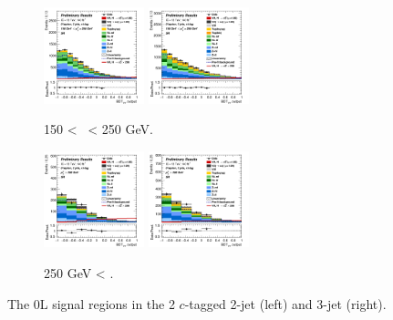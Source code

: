 \vspace*{\fill}

\begin{figure}[h!]
    \centering
    \begin{subfigure}[b]{\textwidth}
        \centering
        \includegraphics[width=0.32\textwidth]{Images/VH/Own_fit/postfit_VHcc/Region_distmva_BMax250_BMin150_DSR_J2_TTypext_T2_L0_Y6051_GlobalFit_conditionnal_mu1.png}
        \includegraphics[width=0.32\textwidth]{Images/VH/Own_fit/postfit_VHcc/Region_distmva_BMax250_BMin150_DSR_J3_TTypext_T2_L0_Y6051_GlobalFit_conditionnal_mu1.png}
        \caption{150 < \ptv\ < 250 GeV.}
        \label{fig:plots_VHcc_OL_150_SR_2c}
    \end{subfigure}
    \begin{subfigure}[b]{\textwidth}
        \centering
        \includegraphics[width=0.32\textwidth]{Images/VH/Own_fit/postfit_VHcc/Region_distmva_BMin250_DSR_J2_TTypext_T2_L0_Y6051_GlobalFit_conditionnal_mu1.png}
        \includegraphics[width=0.32\textwidth]{Images/VH/Own_fit/postfit_VHcc/Region_distmva_BMin250_DSR_J3_TTypext_T2_L0_Y6051_GlobalFit_conditionnal_mu1.png}
        \caption{250 GeV < \ptv.}
        \label{fig:plots_VHcc_OL_250_SR_2c}
    \end{subfigure}
    \caption{The 0L signal regions in the 2 $c$-tagged 2-jet (left) and 3-jet (right).}
    \label{fig:plots_VHcc_OL_SR_2c}
\end{figure} 
